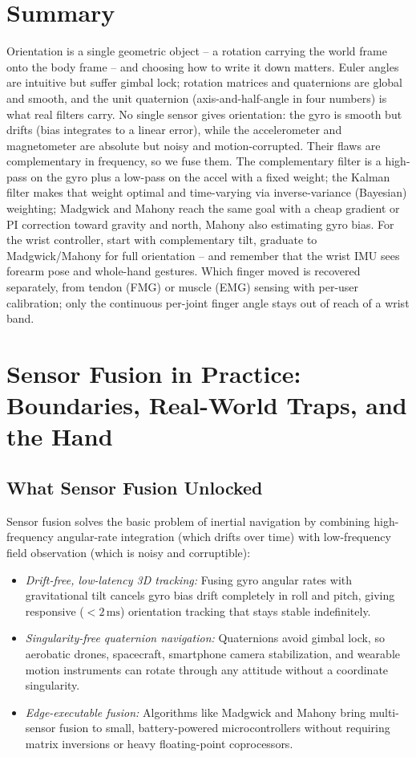 \section{Summary}
\label{ch36:summary}

Orientation is a single geometric object -- a rotation carrying the world frame onto the
body frame -- and choosing how to write it down matters. Euler angles are intuitive but
suffer gimbal lock; rotation matrices and quaternions are global and smooth, and the
unit quaternion (axis-and-half-angle in four numbers) is what real filters carry. No
single sensor gives orientation: the gyro is smooth but drifts (bias integrates to a
linear error), while the accelerometer and magnetometer are absolute but noisy and
motion-corrupted. Their flaws are complementary in frequency, so we fuse them. The
complementary filter is a high-pass on the gyro plus a low-pass on the accel with a fixed
weight; the Kalman filter makes that weight optimal and time-varying via inverse-variance
(Bayesian) weighting; Madgwick and Mahony reach the same goal with a cheap gradient or PI
correction toward gravity and north, Mahony also estimating gyro bias. For the wrist
controller, start with complementary tilt, graduate to Madgwick/Mahony for full
orientation -- and remember that the wrist IMU sees forearm pose and whole-hand gestures.
Which finger moved is recovered separately, from tendon (FMG) or muscle (EMG) sensing
with per-user calibration; only the continuous per-joint finger angle stays out of reach
of a wrist band.

\section{Sensor Fusion in Practice: Boundaries, Real-World Traps, and the Hand}
\label{ch36:capabilities-limits}

\subsection{What Sensor Fusion Unlocked}
Sensor fusion solves the basic problem of inertial navigation by combining high-frequency angular-rate integration (which drifts over time) with low-frequency field observation (which is noisy and corruptible):
\begin{itemize}
  \item \emph{Drift-free, low-latency 3D tracking:} Fusing gyro angular rates with gravitational tilt cancels gyro bias drift completely in roll and pitch, giving responsive ($<2\,\text{ms}$) orientation tracking that stays stable indefinitely.
  \item \emph{Singularity-free quaternion navigation:} Quaternions avoid gimbal lock, so aerobatic drones, spacecraft, smartphone camera stabilization, and wearable motion instruments can rotate through any attitude without a coordinate singularity.
  \item \emph{Edge-executable fusion:} Algorithms like Madgwick and Mahony bring multi-sensor fusion to small, battery-powered microcontrollers without requiring matrix inversions or heavy floating-point coprocessors.
\end{itemize}

